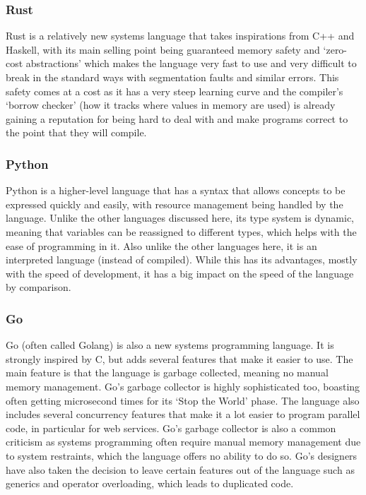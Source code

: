 \subsubsection{Rust}
Rust is a relatively new systems language that takes inspirations from C++ and
Haskell, with its main selling point being guaranteed memory safety and
`zero-cost abstractions' which makes the language very fast to use and very
difficult to break in the standard ways with segmentation faults and similar
errors. This safety comes at a cost as it has a very steep learning curve and
the compiler's `borrow checker' (how it tracks where values in memory are used)
is already gaining a reputation for being hard to deal with and make programs
correct to the point that they will compile.

\subsubsection{Python}
Python is a higher-level language that has a syntax that allows concepts to be
expressed quickly and easily, with resource management being handled by the
language. Unlike the other languages discussed here, its type system is dynamic,
meaning that variables can be reassigned to different types, which helps with
the ease of programming in it. Also unlike the other languages here, it is an
interpreted language (instead of compiled). While this has its advantages,
mostly with the speed of development, it has a big impact on the speed of the
language by comparison.

\subsubsection{Go}
Go (often called Golang) is also a new systems programming language. It is
strongly inspired by C, but adds several features that make it easier to use.
The main feature is that the language is garbage collected, meaning no manual
memory management. Go's garbage collector is highly sophisticated too, boasting
often getting microsecond times for its `Stop the World' phase. The language
also includes several concurrency features that make it a lot easier to program
parallel code, in particular for web services. Go's garbage collector is also a
common criticism as systems programming often require manual memory management
due to system restraints, which the language offers no ability to do so. Go's
designers have also taken the decision to leave certain features out of the
language such as generics and operator overloading, which leads to duplicated
code.

